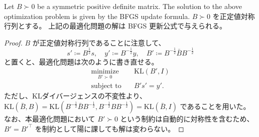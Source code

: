 \documentclass[0_main]{subfiles}
\begin{document}
\begin{proposition}
    \ifEn
        Let $B \succ 0$ be a symmetric positive definite matrix.
        The solution to the above optimization problem is given by the BFGS update formula.
    \else
        $B \succ 0$ を正定値対称行列とする。
        上記の最適化問題の解は BFGS 更新公式で与えられる。
    \fi
\end{proposition}
\begin{proof}
    $B$ が正定値対称行列であることに注意して、
    \begin{equation*}
        s' \coloneqq B^{\frac{1}{2}} s, \quad y' \coloneqq B^{-\frac{1}{2}} y, \quad B' \coloneqq B^{-\frac{1}{2}} \bar{B} B^{-\frac{1}{2}}
    \end{equation*}
    と置くと、最適化問題は次のように書き直せる。
    \begin{align*}
        \underset{B' \succ 0}{\text{minimize}} & \quad \mathrm{KL}(B', I) \\
        \text{subject to}                      & \quad B' s' = y'.
    \end{align*}
    ただし、KLダイバージェンスの不変性より、$\mathrm{KL}(\bar{B}, B) = \mathrm{KL}(B^{-\frac{1}{2}} \bar{B} B^{-\frac{1}{2}}, B^{-\frac{1}{2}} B B^{-\frac{1}{2}}) = \mathrm{KL}(\bar{B}, I)$ であることを用いた。
    なお、本最適化問題において $B' \succ 0$ という制約は自動的に対称性を含むため、$B' = B'^\top$ を制約として陽に課しても解は変わらない。


\end{proof}
\end{document}
